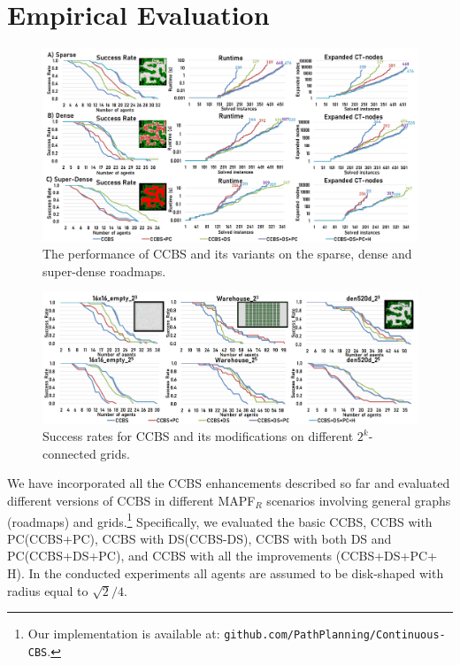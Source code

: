 \documentclass[letterpaper]{article} %
\newcommand{\ccbs}{\ac{CCBS}\xspace}
\newcommand{\ccbsds}{\ac{CCBS-DS}\xspace}
\newcommand{\mapfr}{{MAPF}$_R$\xspace}
\newcommand{\pc}{\ac{PC}\xspace}
\newcommand{\ds}{\ac{DS}\xspace}
\begin{document}

\section{Empirical Evaluation}

\begin{figure}[t]
    \centering
    \includegraphics[width=\textwidth]{Roadmaps_results.png}
    \caption{The performance of \ccbs and its variants on the sparse, dense and super-dense roadmaps.}
    \label{figRoadmapsResults}
\end{figure}

\begin{figure}[t]
    \centering
    \includegraphics[width=\textwidth]{Grids_SR_all.png}
    \caption{Success rates for \ccbs and its modifications on different $2^k$-connected grids.}
    \label{figGridsResults}
\end{figure}

We have incorporated all the \ccbs enhancements described so far and evaluated different versions of \ccbs in different \mapfr scenarios involving general graphs (roadmaps) and grids.\footnote{Our implementation is available at: \texttt{github.com/PathPlanning/Continuous-CBS}.}
Specifically, we evaluated the basic \ccbs, \ccbs with \pc (\ccbs+\pc), \ccbs with \ds (\ccbsds),
\ccbs with both \ds and \pc (\ccbs+\ds+\pc),
and \ccbs with all the improvements (\ccbs+\ds+\pc + H).
In the conducted experiments all agents are assumed to be disk-shaped with radius equal to $\sqrt{2}/4$.
\end{document}

